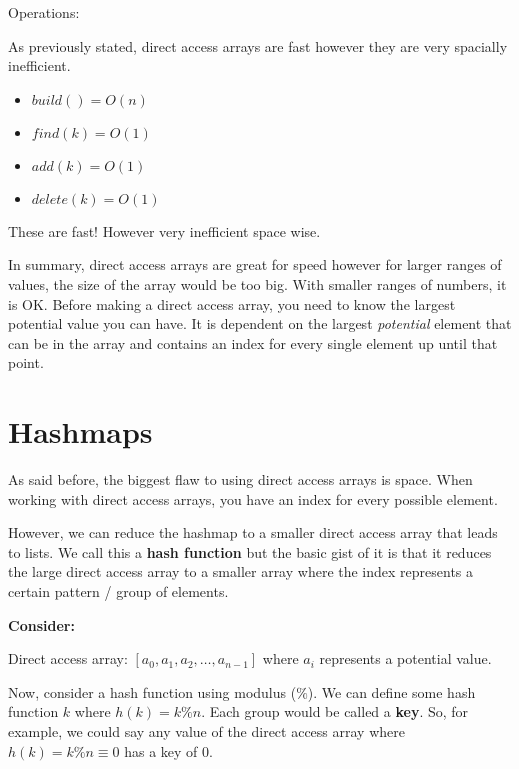 \documentclass[11pt,a4paper,english]{report}
\begin{document}
\bigskip
\begin{bluebox}{Operations:} {

    As previously stated, direct access arrays are fast however they are very spacially inefficient.

    \begin{itemize}

    \item $build() = O(n)$
    \item $find(k) = O(1)$
    \item $add(k) = O(1)$
    \item $delete(k) = O(1)$

    \end{itemize}

    These are fast! However very inefficient space wise.


}\end{bluebox}

\bigskip
\noindent
In summary, direct access arrays are great for speed however for larger ranges of values, the size of the array would be too big. With smaller ranges of numbers, it is OK. Before making a direct access array, you need to know the largest potential value you can have. It is dependent on the largest \textit{potential} element that can be in the array and contains an index for every single element up until that point.


\section{Hashmaps}

As said before, the biggest flaw to using direct access arrays is space. When working with direct access arrays, you have an index for every possible element.

\bigskip
\noindent
However, we can reduce the hashmap to a smaller direct access array that leads to lists. We call this a \textbf{hash function} but the basic gist of it is that it reduces the large direct access array to a smaller array where the index represents a certain pattern / group of elements.

\bigskip
\noindent 
\textbf{Consider:}

\noindent Direct access array: $[ a_0, a_1, a_2, \ldots, a_{n-1} ]$ where $a_i$ represents a potential value.

\bigskip

\noindent Now, consider a hash function using modulus ($\%$). We can define some hash function $k$ where $h(k) = k \% n$. Each group would be called a \textbf{key}. So, for example, we could say any value of the direct access array where $h(k) = k \% n \equiv 0$ has a key of 0.
\end{document}
